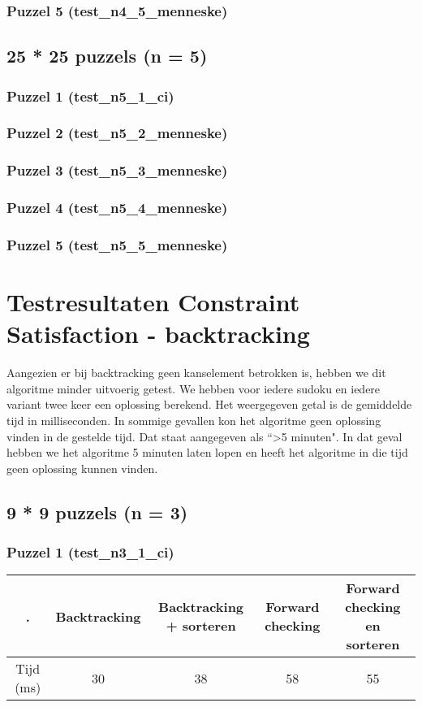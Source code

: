 \documentclass[]{report}
\begin{document}
\begin{appendices}
\subsection{Puzzel 5 (test\_n4\_5\_menneske)}
\section{25 * 25 puzzels (n = 5)}
\subsection{Puzzel 1 (test\_n5\_1\_ci)}

\subsection{Puzzel 2 (test\_n5\_2\_menneske)}
\subsection{Puzzel 3 (test\_n5\_3\_menneske)}
\subsection{Puzzel 4 (test\_n5\_4\_menneske)}
\subsection{Puzzel 5 (test\_n5\_5\_menneske)}

\chapter{Testresultaten Constraint Satisfaction - backtracking}
Aangezien er bij backtracking geen kanselement betrokken is, hebben we dit algoritme minder uitvoerig getest. We hebben voor iedere sudoku en iedere variant twee keer een oplossing berekend. Het weergegeven getal is de gemiddelde tijd in milliseconden. In sommige gevallen kon het algoritme geen oplossing vinden in de gestelde tijd. Dat staat aangegeven als \textquotedblleft\textgreater 5 minuten". In dat geval hebben we het algoritme 5 minuten laten lopen en heeft het algoritme in die tijd geen oplossing kunnen vinden.
\section{9 * 9 puzzels (n = 3)}
\subsection{Puzzel 1 (test\_n3\_1\_ci)}
\begin{tabular}{|c||c|c|c|c|}
\hline . & Backtracking & Backtracking + sorteren & Forward checking & Forward checking en sorteren \\ 
\hline \hline Tijd (ms) & 30 & 38 & 58 & 55 \\ 
\hline 
\end{tabular}

\end{appendices}
\end{document}
